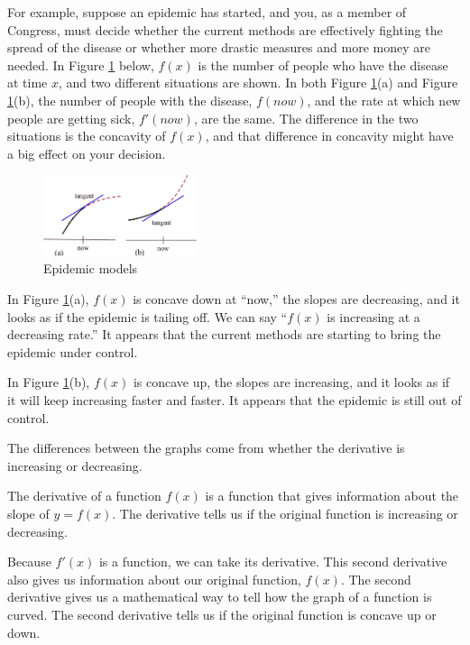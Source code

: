 For example, suppose an epidemic has started, and you, as a member of Congress, must decide whether the current methods are effectively fighting the spread of the disease or whether more drastic measures and more money are needed. In Figure \ref{fig:3-3-epidemic} below, $f(x)$ is the number of people who have the disease at time $x$, and two different situations are shown. In both Figure \ref{fig:3-3-epidemic}(a) and Figure \ref{fig:3-3-epidemic}(b), the number of people with the disease, $f(now)$, and the rate at which new people are getting sick, $f'(now)$, are the same. The difference in the two situations is the concavity of $f(x)$, and that difference in concavity might have a big effect on your decision.

\begin{figure}[!ht]
  \centering
    \includegraphics[width=0.4\textwidth]{img/chap3/image046.png}
    \caption{Epidemic models}
    \label{fig:3-3-epidemic}
\end{figure}
In Figure \ref{fig:3-3-epidemic}(a), $f(x)$ is concave down at ``now,'' the slopes are decreasing, and it looks as if the epidemic is tailing off. We can say ``$f(x)$ is increasing at a decreasing rate.'' It appears that the current methods are starting to bring the epidemic under control.

In Figure \ref{fig:3-3-epidemic}(b), $f(x)$ is concave up, the slopes are increasing, and it looks as if it will keep increasing faster and faster. It appears that the epidemic is still out of control.

The differences between the graphs come from whether the derivative is increasing or decreasing.

The derivative of a function $f(x)$ is a function that gives information about the slope of $y=f(x)$. The derivative tells us if the original function is increasing or decreasing.

Because $f'(x)$ is a function, we can take its derivative. This second derivative also gives us information about our original function, $f(x)$. The second derivative gives us a mathematical way to tell how the graph of a function is curved. The second derivative tells us if the original function is concave up or down.


